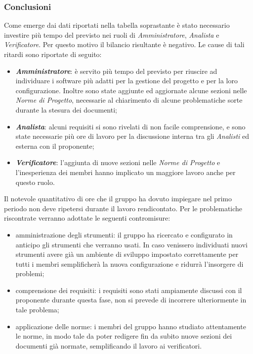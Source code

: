 \subsubsection{Conclusioni}
Come emerge dai dati riportati nella tabella soprastante è stato necessario investire più tempo del previsto nei ruoli di \textit{Amministratore}, \textit{Analista} e \textit{Verificatore}. Per questo motivo il bilancio risultante è negativo. Le cause di tali ritardi sono riportate di seguito:
\begin{itemize}
\item \textbf{\textit{Amministratore}}: è servito più tempo del previsto per riuscire ad individuare i software più adatti per la gestione del progetto e per la loro  configurazione. Inoltre sono state aggiunte ed aggiornate alcune sezioni nelle \textit{Norme di Progetto}, necessarie al chiarimento di alcune problematiche sorte durante la stesura dei documenti;
\item \textbf{\textit{Analista}}: alcuni requisiti si sono rivelati di non facile comprensione, e sono state necessarie più ore di lavoro per la discussione interna tra gli \textit{Analisti} ed esterna con il proponente;
\item \textbf{\textit{Verificatore}}: l’aggiunta di nuove sezioni nelle \textit{Norme di Progetto} e l'inesperienza dei membri hanno implicato un maggiore lavoro anche per questo ruolo.
\end{itemize}
Il notevole quantitativo di ore che il gruppo ha dovuto impiegare nel primo periodo non deve ripetersi durante il lavoro rendicontato. Per le problematiche riscontrate verranno adottate le seguenti contromisure:
\begin{itemize}
	\item amministrazione degli strumenti: il gruppo ha ricercato e configurato in anticipo gli strumenti che verranno usati. In caso venissero individuati nuovi strumenti avere già un ambiente di sviluppo impostato correttamente per tutti i membri semplificherà la nuova configurazione e ridurrà l'insorgere di problemi;
	\item comprensione dei requisiti: i requisiti sono stati ampiamente discussi con il proponente durante questa fase, non si prevede di incorrere ulteriormente in tale problema;
	\item applicazione delle norme: i membri del gruppo hanno studiato attentamente le norme, in modo tale da poter redigere fin da subito nuove sezioni dei documenti già normate, semplificando il lavoro ai verificatori.
\end{itemize}

